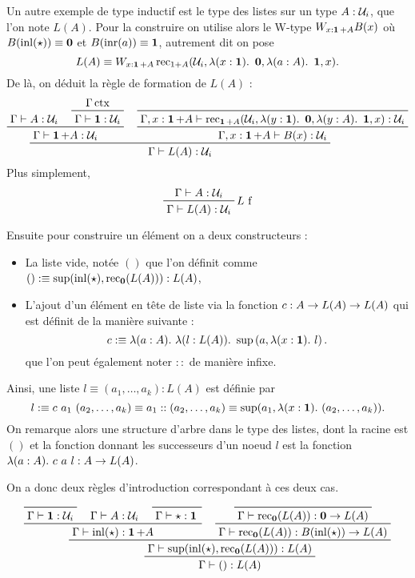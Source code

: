 \documentclass[../../rapport.tex]{subfiles}
\begin{document}
  Un autre exemple de type inductif est le type des listes sur un type $A : \mathcal U_i$, que l'on note $L(A)$.
  Pour la construire on utilise alors le W-type $W_{x:\operatorname{\textbf{1}}+A}B(x)$ où $B(\operatorname{inl}(\star)) \equiv \operatorname{\textbf{0}}$ et $B(\operatorname{inr}(a)) \equiv \operatorname{\textbf{1}}$,
  autrement dit on pose
  $$L(A) \equiv W_{x:\operatorname{\textbf{1}} + A}\operatorname{rec}_{1+A}(\mathcal U_i, \lambda(x : \operatorname{\textbf{1}}).\ \operatorname{\textbf{0}}, \lambda(a : A).\ \operatorname{\textbf{1}}, x).$$
  De là, on déduit la règle de formation de $L(A)$ :
  $$
  \prfinterspace=1.2em
  \prftree
    {
      \prftree
	{\Gamma \vdash A : \U_i}
	{\prftree{\Gamma \ctx}{\Gamma \vdash \1 : \U_i}}
	  {\Gamma \vdash \1 + A : \U_i}
    }
    {
      \prftree
	{\prfaxiom{\Gamma, x : \1 + A \vdash \rec_{\1+A}(\U_i, \lambda(y : \1).\ \0, \lambda(y : A).\ \1, x) : \U_i}}
	{\Gamma, x : \1 + A \vdash B(x) : \U_i}
    }
      {\Gamma \vdash L(A) : \U_i}
  $$
  Plus simplement,
  $$
  \prftree[r]{$L$ f}{\Gamma \vdash A : \U_i}{\Gamma \vdash L(A) : \U_i}
  $$

  Ensuite pour construire un élément on a deux constructeurs :
  \begin{itemize}
    \item La liste vide, notée $()$ que l'on définit comme $() :\equiv \sup(\operatorname{inl}(\star), \operatorname{rec}_{\operatorname{\textbf{0}}}(L(A))) : L(A)$,
    \item L'ajout d'un élément en tête de liste via la fonction $c : A \rightarrow L(A) \rightarrow L(A)$ qui est définit de la manière suivante :
      $$c :\equiv \lambda(a : A).\ \lambda(l : L(A)).\ \sup\left(a, \lambda(x : \1).\ l\right).$$
      que l'on peut également noter $::$ de manière infixe.
  \end{itemize}
  Ainsi, une liste $l \equiv (a_1, \hdots, a_k) : L(A)$ est définie par
  $$l :\equiv c\ a_1\ (a_2, \hdots, a_k) \equiv a_1 :: (a_2, \hdots, a_k) \equiv \sup(a_1, \lambda(x : \operatorname{\textbf{1}}).\ (a_2, \hdots, a_k)).$$
  On remarque alors une structure d'arbre dans le type des listes, dont la racine est $()$
  et la fonction donnant les successeurs d'un noeud $l$ est la fonction $\lambda(a:A).\ c\ a\ l : A \rightarrow L(A)$.

  On a donc deux règles d'introduction correspondant à ces deux cas.

  $$
  \prfinterspace=1.2em
  \prftree
    {\prftree
      {\prftree
	{\prfaxiom{\Gamma \vdash \1 : \U_i}}
	{\Gamma \vdash A : \U_i}
	{\prfaxiom{\Gamma \vdash \star : \1}}
      {\Gamma \vdash \inl(\star) : \1 + A}}
      {\prftree
	{\prfaxiom{\Gamma \vdash \rec_{\0}(L(A)) : \0 \fun L(A)}}
      {\Gamma\vdash \rec_{\0}(L(A)) : B(\inl(\star)) \fun L(A)}}
    {\Gamma \vdash \sup(\inl(\star), \rec_{\0}(L(A))) : L(A)}}
  {\Gamma \vdash () : L(A)}
  $$
\end{document}
